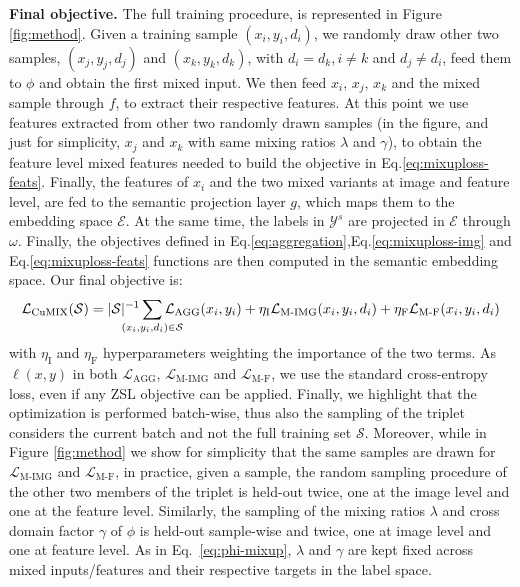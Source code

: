 \documentclass[runningheads]{llncs}
\newcommand{\myparagraph}[1]{\noindent\textbf{#1}}
\begin{document}
\myparagraph{Final objective.} {The full training procedure, is represented in Figure \ref{fig:method}. Given a training sample $(x_i,y_i,d_i)$, we randomly draw other two samples, $(x_j,y_j,d_j)$ and $(x_k,y_k,d_k)$, with $d_i=d_k,i\neq k$ and $d_j\neq d_i$, feed them to $\phi$ and obtain the first mixed input. We then feed $x_i$, $x_j$, $x_k$ and the mixed sample through $f$, to extract their respective features. At this point we use features extracted from other two randomly drawn samples (in the figure, and just for simplicity, $x_j$ and $x_k$ with same mixing ratios $\lambda$ and $\gamma$), to obtain the feature level mixed features needed to build the objective in Eq.\eqref{eq:mixuploss-feats}. Finally, the features of $x_i$ and the two mixed variants at image and feature level, are fed to the semantic projection layer $g$, which maps them to the embedding space $\mathcal{E}$. At the same time, the labels in $\mathcal{Y}^s$ are projected in $\mathcal{E}$ through $\omega$. Finally, the objectives defined in Eq.\eqref{eq:aggregation},Eq.\eqref{eq:mixuploss-img} and Eq.\eqref{eq:mixuploss-feats} functions are then computed in the semantic embedding space. } 
Our final objective is:
  \begin{equation}
 \label{eq:final-objective}
 \mathcal{L}_{\text{CuMIX}}(\mathcal{S}) = {|\mathcal{S}|^{-1}}\sum_{\mathclap{(x_i,y_i,d_i)\in\mathcal{S}}}\mathcal{L}_{\text{AGG}}(x_i,y_i)+\\\eta_{\text{I}}\mathcal{L}_{\text{M-IMG}}(x_i,y_i,d_i)+\eta_{\text{F}}\mathcal{L}_{\text{M-F}}(x_i,y_i,d_i) 
 \end{equation}
with $\eta_{\text{I}}$ and $\eta_{\text{F}}$ hyperparameters weighting the importance of the two terms. As $\ell(x,y)$ in both $\mathcal{L}_{\text{AGG}}$, $\mathcal{L}_{\text{M-IMG}}$ and $\mathcal{L}_{\text{M-F}}$, we use the standard cross-entropy loss, even if any ZSL objective can be applied. Finally, we highlight that the optimization is performed batch-wise, thus also the sampling of the triplet considers the current batch and not the full training set $\mathcal{S}$. Moreover, while in Figure \ref{fig:method} we show for simplicity that the same samples are drawn for $\mathcal{L}_{\text{M-IMG}}$ and $\mathcal{L}_{\text{M-F}}$, in practice, given a sample, the random sampling procedure of the other two members of the triplet is held-out twice, one at the image level and one at the feature level. Similarly, the sampling of the mixing ratios $\lambda$ and cross domain factor $\gamma$ of $\phi$ is held-out sample-wise and twice, one at image level and one at feature level. As in Eq.~\eqref{eq:phi-mixup}, $\lambda$ and $\gamma$ are kept fixed across mixed inputs/features and their respective targets in the label space. 
\end{document}
